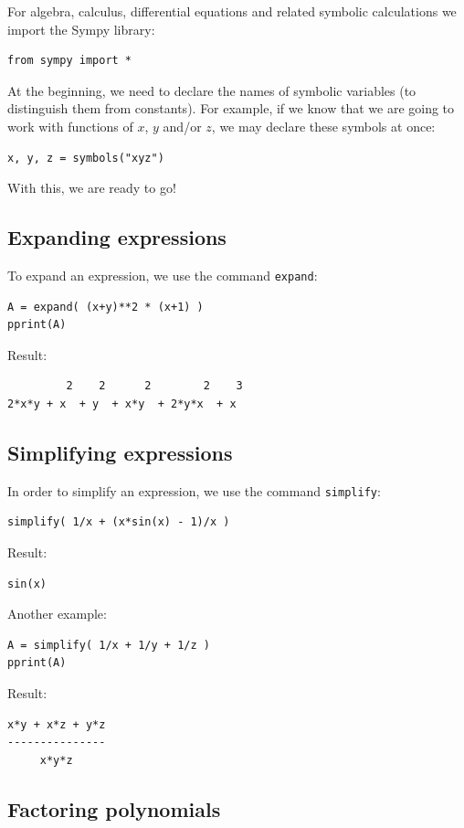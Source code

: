 \documentclass[article,A4,12pt]{llncs}
\begin{document}
For algebra, calculus, differential equations and related symbolic calculations 
we import the Sympy library:

\begin{verbatim}
from sympy import *
\end{verbatim}
At the beginning, we need to declare the names of symbolic variables (to distinguish 
them from constants). For example, if we know that we are going to work with functions 
of $x$, $y$ and/or $z$, we may declare these symbols at once:
\begin{verbatim}
x, y, z = symbols("xyz")
\end{verbatim}
With this, we are ready to go!

\subsection{Expanding expressions}

To expand an expression, we use the command {\tt expand}:
\begin{verbatim}
A = expand( (x+y)**2 * (x+1) )
pprint(A)
\end{verbatim}
Result:
\begin{verbatim}
         2    2      2        2    3
2*x*y + x  + y  + x*y  + 2*y*x  + x 
\end{verbatim}

\subsection{Simplifying expressions}

In order to simplify an expression, we use the command {\tt simplify}:
\begin{verbatim}
simplify( 1/x + (x*sin(x) - 1)/x )
\end{verbatim}
Result:
\begin{verbatim}
sin(x)
\end{verbatim}
Another example:
\begin{verbatim}
A = simplify( 1/x + 1/y + 1/z )
pprint(A)
\end{verbatim}
Result:
\begin{verbatim}
x*y + x*z + y*z
---------------
     x*y*z     
\end{verbatim}

\subsection{Factoring polynomials}
\end{document}
